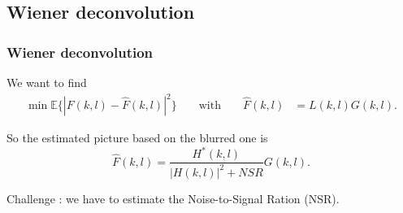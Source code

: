\subsection{Wiener deconvolution}
\begin{frame}
\frametitle[Wiener deconvolution]{Wiener deconvolution }
We want to find
\begin{align*}
\min \mathbb{E}\{|F(k,l) - \hat{F}(k,l)|^2\}&
&\text{ with }&
& \hat{F}(k,l) &= L(k,l)G(k,l).
\end{align*}

So the estimated picture based on the blurred one is
\begin{equation*}
 \hat{F}(k,l) = \frac{H^*(k,l)}{|H(k,l)|^2 + NSR} G(k,l).
\end{equation*}

Challenge :  we have to estimate the Noise-to-Signal Ration (NSR).

\end{frame}